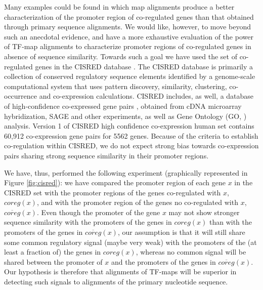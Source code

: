 Many examples could be found in which map alignments produce a better
characterization of the promoter region of co-regulated genes than
that obtained through primary sequence alignments. We would like,
however, to move beyond such an anecdotal evidence, and have a more
exhaustive evaluation of the power of TF-map alignments to characterize
promoter regions of co-regulated genes in absence of sequence
similarity. Towards such a goal we have used the set of co-regulated
genes in the CISRED database \citep{robertson:2006a}. The CISRED 
database is primarily a collection of conserved regulatory sequence
elements identified by a genome-scale computational system that uses
pattern discovery, similarity, clustering, co-occurrence and co-expression 
calculations. CISRED includes, as well, a database of high-confidence 
co-expressed gene pairs \citep{griffith:2005a}, obtained from cDNA microarray 
hybridization, SAGE and other experiments, as well as Gene Ontology 
(GO, \cite{tgoc:2000a}) analysis. Version 1 of CISRED high confidence 
co-expression human set contains 60,912 co-expression gene pairs for 5562 genes. 
Because of the criteria to establish co-regulation within CISRED, we do not 
expect strong bias towards co-expression pairs sharing strong sequence 
similarity in their promoter regions. 

We have, thus,  performed the following experiment (graphically represented
in Figure \ref{fig:cisred}):
we have compared the promoter region of each gene $x$ in the CISRED
set with the promoter regions of the genes co-regulated with $x$,
$coreg(x)$, and with the promoter region of the genes no co-regulated
with $x$, $\overline{coreg}(x)$. Even though the promoter of the gene
$x$ may not show stronger sequence similarity with the promoters of the
genes in $coreg(x)$ than with the promoters of the genes in 
$\overline{coreg}(x)$, our assumption is that it will still share
some common regulatory signal (maybe very weak) with the promoters of
the (at least a fraction of) the genes in $coreg(x)$, whereas no
common signal will be shared between the promoter of $x$ and the
promoters of the genes in $\overline{coreg}(x)$. Our hypothesis is
therefore that alignments of TF-maps will be superior in detecting
such signals to alignments of the primary nucleotide sequence. 

